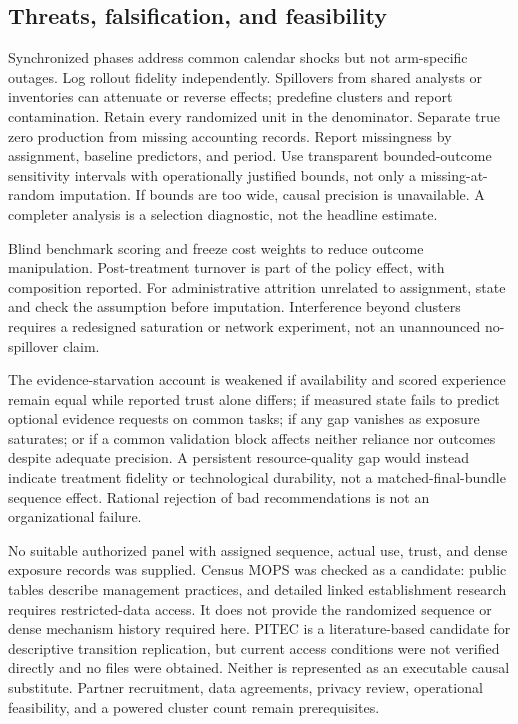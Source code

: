 \documentclass[11pt]{article}
\begin{document}
\subsection{Threats, falsification, and feasibility}
Synchronized phases address common calendar shocks but not arm-specific outages. Log rollout fidelity independently. Spillovers from shared analysts or inventories can attenuate or reverse effects; predefine clusters and report contamination. Retain every randomized unit in the denominator. Separate true zero production from missing accounting records. Report missingness by assignment, baseline predictors, and period. Use transparent bounded-outcome sensitivity intervals with operationally justified bounds, not only a missing-at-random imputation. If bounds are too wide, causal precision is unavailable. A completer analysis is a selection diagnostic, not the headline estimate.

Blind benchmark scoring and freeze cost weights to reduce outcome manipulation. Post-treatment turnover is part of the policy effect, with composition reported. For administrative attrition unrelated to assignment, state and check the assumption before imputation. Interference beyond clusters requires a redesigned saturation or network experiment, not an unannounced no-spillover claim.

The evidence-starvation account is weakened if availability and scored experience remain equal while reported trust alone differs; if measured state fails to predict optional evidence requests on common tasks; if any gap vanishes as exposure saturates; or if a common validation block affects neither reliance nor outcomes despite adequate precision. A persistent resource-quality gap would instead indicate treatment fidelity or technological durability, not a matched-final-bundle sequence effect. Rational rejection of bad recommendations is not an organizational failure.

No suitable authorized panel with assigned sequence, actual use, trust, and dense exposure records was supplied. Census MOPS was checked as a candidate: public tables describe management practices, and detailed linked establishment research requires restricted-data access. It does not provide the randomized sequence or dense mechanism history required here. PITEC is a literature-based candidate for descriptive transition replication, but current access conditions were not verified directly and no files were obtained. Neither is represented as an executable causal substitute. Partner recruitment, data agreements, privacy review, operational feasibility, and a powered cluster count remain prerequisites.
\end{document}
